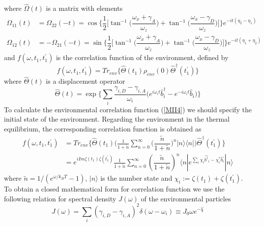 \documentclass[aps,prl,tightenlines,onecolumn,superscriptaddress]{revtex4}
\begin{document}
where $\hat\Omega(t)$ is a matrix with elements
\begin{align}\label{MII3}
\Omega_{11}(t)&=\Omega_{22}(-t)=\cos\Big\{\dfrac{1}{2}\big[\tan^{-1}\big(\dfrac{\omega_{x}+\gamma_{A}}{\omega_{z}}\big)
+\tan^{-1}\big(\dfrac{\omega_{x}-\gamma_{D}}{\omega_{z}}\big )\big]\Big\} e^{-i t(\eta_{2}-\eta_{1})}\nonumber \\
\Omega_{12}(t)&=-\Omega_{21}(-t)=\sin\Big\{\dfrac{1}{2}\big[\tan^{-1}\big(\dfrac{\omega_{x}+\gamma_{A}}{\omega_{z}}\big)
+\tan^{-1}\big(\dfrac{\omega_{x}-\gamma_{D}}{\omega_{z}}\big )\big]\Big\} e^{-i t(\eta_{1}+\eta_{2})}
\end{align}
and $ f(\omega, t_{1},t^{\prime}_{1}) $ is the correlation function of the environment, defined by
\begin{equation}\label{MII4}
f(\omega, t_{1},t^{\prime}_{1})=Tr_{env}\big\{\hat\Theta(t_{1})\rho_{env}(0)\hat\Theta^{\dag}(t^{\prime}_{1})\big\}
\end{equation}
where $\hat\Theta(t)$ is a displacement operator
\begin{equation}\label{MII5}
\hat\Theta(t)=\exp\Big\{\sum_{i}\dfrac{\gamma_{i,D}-\gamma_{i,A}}{\omega_{i}}\Big(e^{i\omega_{i}t}\hat b_{i}^{\dag}-e^{-i\omega_{i}t}\hat b_{i}\Big)\Big\}
\end{equation}
To calculate the environmental correlation function (\ref{MII4}) we should specify the initial state of the environment. Regarding the environment in the thermal equilibrium, the corresponding correlation function is obtained as
\begin{align}\label{MII6}
f(\omega,t_{1},t^{\prime}_{1})&=Tr_{env}\big\{\hat\Theta(t_{1})\Big(\frac{1}{1+\tilde{n}}\sum_{n=0}^{\infty}\big(\dfrac{\tilde{n}}{1+\tilde{n}}\big)^{n}|n\rangle\langle n|\Big)\hat\Theta^{\dag}(t^{\prime}_{1})\big\}\nonumber \\
&=e^{i Im\zeta(t_{1})\zeta(t^{\prime}_{1})}\frac{1}{1+\tilde{n}}\sum_{n=0}^{\infty}(\dfrac{\tilde{n}}{1+\tilde{n}})^{n}\langle n|e^{\sum_{i}\chi_{i}\hat{b^{\dag}}_{i}-\chi^{\ast}_{i}\hat{b_{i}}}|n\rangle
\end{align}
where $\tilde{n}=1/(e^{\omega/k_{B}T}-1)$, $|n\rangle$ is the number state and $\chi_{i}:=\zeta(t_{1})+\zeta(t^{\prime}_{1})$. To obtain a closed mathematical form for correlation function we use the following relation for spectral density $J(\omega)$ of the environmental particles
\begin{equation}\label{MII7}
J(\omega)=\sum_{i}(\gamma_{i,D}-\gamma_{i,A})^{2}\delta(\omega-\omega_{i})\equiv J_{0}\omega e^{-\frac{\omega}{\lambda}}
\end{equation}
\end{document}
